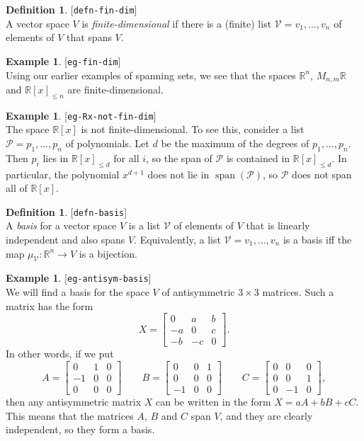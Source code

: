 \documentclass{amsart}
\newcommand{\lbl}[1]{\label{#1}\textup{[\texttt{#1}]}\ \\}
\newcommand{\lbl}{\label}
\newcommand{\R}         {{\mathbb{R}}}
\newcommand{\spn}       {\operatorname{span}}
\newcommand{\bsm}       {\left[\begin{smallmatrix}}
\newcommand{\esm}       {\end{smallmatrix}\right]}
\newcommand{\tm}        {\times}
\newcommand{\xra}       {\xrightarrow}
\newcommand{\CP}        {{\mathcal{P}}}
\newcommand{\CV}        {{\mathcal{V}}}
\renewcommand{\:}       {\colon}
\theoremstyle{definition}
\newtheorem{definition}[theorem]{Definition}
\newtheorem{example}[theorem]{Example}
\begin{document}
\begin{definition}\lbl{defn-fin-dim}
 A vector space $V$ is \emph{finite-dimensional} if there is
 a (finite) list $\CV=v_1,\ldots,v_n$ of elements of $V$
 that spans $V$.
\end{definition}

\begin{example}\lbl{eg-fin-dim}
 Using our earlier examples of spanning sets, we see that
 the spaces $\R^n$, $M_{n,m}\R$ and $\R[x]_{\leq n}$ are
 finite-dimensional.
\end{example}

\begin{example}\lbl{eg-Rx-not-fin-dim}
 The space $\R[x]$ is not finite-dimensional.  To see this,
 consider a list $\CP=p_1,\ldots,p_n$ of polynomials.  Let
 $d$ be the maximum of the degrees of $p_1,\ldots,p_n$.
 Then $p_i$ lies in $\R[x]_{\leq d}$ for all $i$, so the
 span of $\CP$ is contained in $\R[x]_{\leq d}$.  In
 particular, the polynomial $x^{d+1}$ does not lie in
 $\spn(\CP)$, so $\CP$ does not span all of $\R[x]$.
\end{example}

\begin{definition}\lbl{defn-basis}
 A \emph{basis} for a vector space $V$ is a list $\CV$ of
 elements of $V$ that is linearly independent and also spans
 $V$.  Equivalently, a list $\CV=v_1,\ldots,v_n$ is a basis
 iff the map $\mu_{\CV}\:\R^n\xra{}V$ is a bijection.
\end{definition}

\begin{example}\lbl{eg-antisym-basis}
 We will find a basis for the space $V$ of antisymmetric $3\tm 3$
 matrices.  Such a matrix has the form 
 \[ X = \bsm 0 & a & b \\ -a & 0 & c \\ -b & -c & 0 \esm. \]
 In other words, if we put 
 \[ A = \bsm 0&1&0 \\ -1&0&0 \\  0&0&0 \esm \hspace{2em}
    B = \bsm 0&0&1 \\  0&0&0 \\ -1&0&0 \esm \hspace{2em}
    C = \bsm 0&0&0 \\  0&0&1 \\  0&-1&0 \esm,
 \]
 then any antisymmetric matrix $X$ can be written in the form 
 $X=aA+bB+cC$.  This means that the matrices $A$, $B$ and $C$ span
 $V$, and they are clearly independent, so they form a basis.
\end{example}
\end{document}
